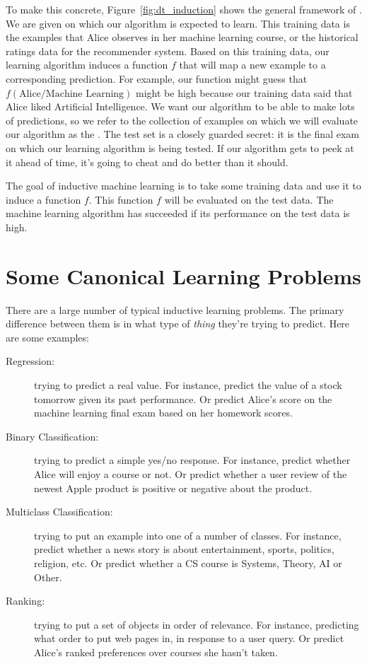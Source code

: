 To make this concrete, Figure~\ref{fig:dt_induction} shows the general
framework of .  We are given  on which our algorithm is expected to learn.  This training
data is the examples that Alice observes in her machine learning
course, or the historical ratings data for the recommender system.
Based on this training data, our learning algorithm induces a function
$f$ that will map a new example to a corresponding prediction.  For
example, our function might guess that $f(\text{Alice/Machine
  Learning})$ might be high because our training data said that Alice
liked Artificial Intelligence.  We want our algorithm to be able to
make lots of predictions, so we refer to the collection of examples on
which we will evaluate our algorithm as the .  The
test set is a closely guarded secret: it is the final exam on which
our learning algorithm is being tested.  If our algorithm gets to peek
at it ahead of time, it's going to cheat and do better than it should.


The goal of inductive machine learning is to take some training data
and use it to induce a function $f$.  This function $f$ will be
evaluated on the test data.  The machine learning algorithm has
succeeded if its performance on the test data is high.

\section{Some Canonical Learning Problems}

There are a large number of typical inductive learning problems.  The
primary difference between them is in what type of \emph{thing}
they're trying to predict.  Here are some examples:

\begin{description}
\item[Regression:] trying to predict a real value.  For instance,
  predict the value of a stock tomorrow given its past performance.
  Or predict Alice's score on the machine learning final exam based on
  her homework scores.

\item[Binary Classification:] trying to predict a simple yes/no
  response.  For instance, predict whether Alice will enjoy a course
  or not.  Or predict whether a user review of the newest Apple
  product is positive or negative about the product.

\item[Multiclass Classification:] trying to put an example into one of
  a number of classes.  For instance, predict whether a news story is
  about entertainment, sports, politics, religion, etc.  Or predict
  whether a CS course is Systems, Theory, AI or Other.

\item[Ranking:] trying to put a set of objects in order of relevance.
  For instance, predicting what order to put web pages in, in response
  to a user query.  Or predict Alice's ranked preferences over courses
  she hasn't taken.
\end{description}

